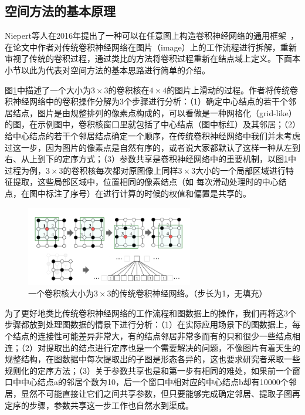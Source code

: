 \documentclass[final]{cvpr}
\begin{document}
\subsection{空间方法的基本原理} 
Niepert等人在2016年提出了一种可以在任意图上构造卷积神经网络的通用框架~\cite{niepert2016learning}，在论文中作者对传统卷积神经网络在图片（image）上的工作流程进行拆解，重新审视了传统的卷积过程，通过类比的方法将卷积过程重新在结点域上定义。下面本小节以此为代表对空间方法的基本思路进行简单的介绍。

图\ref{fig:learn-conv-for-graph-1}中描述了一个大小为$3 \times 3$的卷积核在$4 \times 4$的图片上滑动的过程。作者将传统卷积神经网络中的卷积操作分解为3个步骤进行分析：（1）确定中心结点的若干个邻居结点，图片是由规整排列的像素点构成的，可以看做是一种网格化（grid-like）的图，在示例图中，卷积核窗口里就包括了中心结点（图中标红）及其邻居；（2）给中心结点的若干个邻居结点确定一个顺序，在传统卷积神经网络中我们并未考虑过这一步，因为图片的像素点是自然有序的，或者说大家都默认了这样一种从左到右、从上到下的定序方式；（3）参数共享是卷积神经网络中的重要机制，以图\ref{fig:learn-conv-for-graph-1}中过程为例，$3 \times 3$的卷积核每次都对原图像上同样$3 \times 3$大小的一个局部区域进行特征提取，这些局部区域中，位置相同的像素结点（如
每次滑动处理时的中心结点，在图中标注了序号）在进行计算的时候的权值和偏置是共享的。

\begin{figure}[htb!]
    \centering
    \includegraphics[width=0.65\textwidth]{learn-conv-for-graph-1.png}
    \caption{一个卷积核大小为$3 \times 3$的传统卷积神经网络。（步长为1，无填充）}
    \label{fig:learn-conv-for-graph-1}
\end{figure}


为了更好地类比传统卷积神经网络的工作流程和图数据上的操作，我们再将这3个步骤都放到处理图数据的情景下进行分析：（1）在实际应用场景下的图数据上，每个结点的连接性可能差异非常大，有的结点邻居非常多而有的只和很少一些结点相连；（2）对提取出的结点进行定序也是一个需要解决的问题，不像图片有着天生的规整结构，在图数据中每次提取出的子图是形态各异的，这也要求研究者采取一些规则化的定序方法；（3）关于参数共享也是和第一步有相同的难处，如果前一个窗口中中心结点a的邻居个数为10，后一个窗口中相对应的中心结点b却有10000个邻居，显然不可能直接让它们之间共享参数，但只要能够完成确定邻居、提取子图再定序的步骤，参数共享这一步工作也自然水到渠成。
\end{document}

